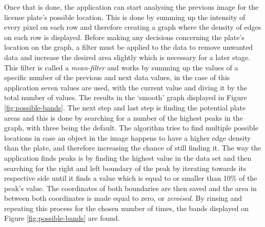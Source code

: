 Once that is done, the application can start analysing the previous image for the license plate's possible location. This is done by summing up the intensity of every pixel on each row and therefore creating a graph where the density of edges on each row is displayed. Before making any decisions concerning the plate's location on the graph, a filter must be applied to the data to remove unwanted data and increase the desired area slightly which is necessary for a later stage. This filter is called a \emph{mean-filter} and works by summing up the values of a specific number of the previous and next data values, in the case of this application seven values are used, with the current value and diving it by the total number of values. The results in the `smooth' graph displayed in Figure \ref{fig:possible-bands}. The next step and last step is finding the potential plate areas and this is done by searching for a number of the highest peaks in the graph, with three being the default. The algorithm tries to find multiple possible locations in case an object in the image happens to have a higher edge density than the plate, and therefore increasing the chance of still finding it. The way the application finds peaks is by finding the highest value in the data set and then searching for the right and left boundary of the peak by iterating towards its respective side until it finds a value which is equal to or smaller than 10\% of the peak's value. The coordinates of both boundaries are then saved and the area in between both coordinates is made equal to zero, or \emph{zeroised}. By rinsing and repeating this process for the chosen number of times, the bands displayed on Figure \ref{fig:possible-bands} are found. 


